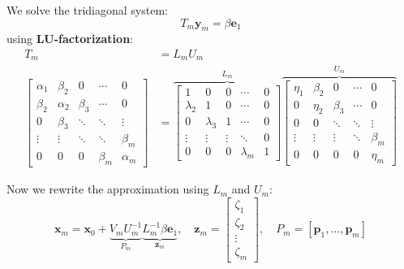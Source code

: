 We solve the tridiagonal system:
\[
  T_m \mathbf{y}_m = \beta \mathbf{e}_1
\]
using \textbf{LU-factorization}:
\begin{align*}
  T_m                                                   & = L_m U_m \\
  \begin{bmatrix}
    \alpha_1 & \beta_2  & 0       & \cdots  & 0        \\
    \beta_2  & \alpha_2 & \beta_3 & \cdots  & 0        \\
    0        & \beta_3  & \ddots  & \ddots  & \vdots   \\
    \vdots   & \vdots   & \ddots  & \ddots  & \beta_m  \\
    0        & 0        & 0       & \beta_m & \alpha_m
  \end{bmatrix} & =
  \overbrace{
    \begin{bmatrix}
      1         & 0         & 0      & \cdots    & 0 \\
      \lambda_2 & 1         & 0      & \cdots    & 0 \\
      0         & \lambda_3 & 1      & \cdots    & 0 \\
      \vdots    & \vdots    & \vdots & \ddots    & 0 \\
      0         & 0         & 0      & \lambda_m & 1
    \end{bmatrix}
  }^{L_m}
  \overbrace{
    \begin{bmatrix}
      \eta_1 & \beta_2 & 0       & \cdots & 0       \\
      0      & \eta_2  & \beta_3 & \cdots & 0       \\
      0      & 0       & \ddots  & \ddots & \vdots  \\
      \vdots & \vdots  & \vdots  & \ddots & \beta_m \\
      0      & 0       & 0       & 0      & \eta_m
    \end{bmatrix}}^{U_m}
\end{align*}

Now we rewrite the approximation using $L_m$ and $U_m$:
\[
  \mathbf{x}_m = \mathbf{x}_0 + \underbrace{V_m U_m^{-1}}_{P_m} \underbrace{L_m^{-1} \beta \mathbf{e}_1}_{\mathbf{z}_m},
  \quad \mathbf{z}_m =
  \begin{bmatrix}
    \zeta_1 \\
    \zeta_2 \\
    \vdots  \\
    \zeta_m
  \end{bmatrix},
  \quad P_m = [\mathbf{p}_1, \ldots, \mathbf{p}_m]
\]

